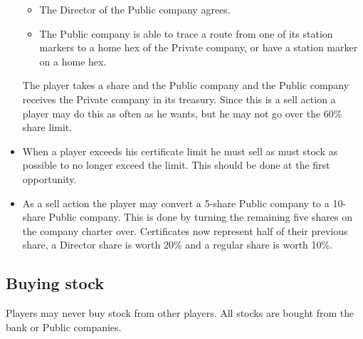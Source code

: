 \documentclass[a4paper]{article}
\begin{document}
\begin{itemize}
\begin{itemize}
		\item The Director of the Public company agrees.
		\item The Public company is able to trace a route from one of its
		station markers to a home hex of the Private company, or have a station
		marker on a home hex.
	\end{itemize}
	The player takes a share and the Public company and the Public company
	receives the Private company in its treasury. Since this is a sell action a
	player may do this as often as he wants, but he may not go over the 60\%
	share limit.
	\item When a player exceeds his certificate limit he must sell as must stock
	as possible to no longer exceed the limit. This should be done at the first
	opportunity.
	\item As a sell action the player may convert a 5-share Public company to a
	10-share Public company. This is done by turning the remaining five shares
	on the company charter over. Certificates now represent half of their
	previous share, a Director share is worth 20\% and a regular share is worth
	10\%.
\end{itemize}

\subsection{Buying stock}\label{sec:buying}
Players may never buy stock from other players. All stocks are bought
from the bank or Public companies.
\end{document}
